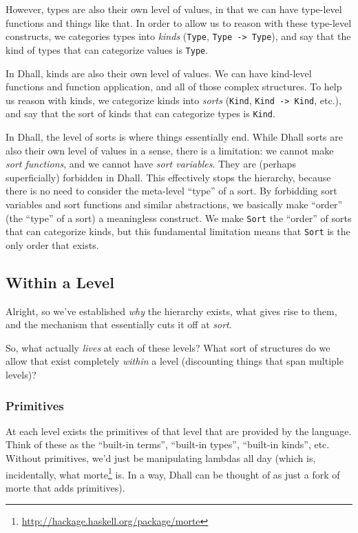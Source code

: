 \documentclass[]{article}
\renewcommand{\href}[2]{#2\footnote{\url{#1}}}
\begin{document}
However, types are also their own level of values, in that we can have
type-level functions and things like that. In order to allow us to reason with
these type-level constructs, we categories types into \emph{kinds}
(\texttt{Type}, \texttt{Type\ -\textgreater{}\ Type}), and say that the kind of
types that can categorize values is \texttt{Type}.

In Dhall, kinds are also their own level of values. We can have kind-level
functions and function application, and all of those complex structures. To help
us reason with kinds, we categorize kinds into \emph{sorts} (\texttt{Kind},
\texttt{Kind\ -\textgreater{}\ Kind}, etc.), and say that the sort of kinds that
can categorize types is \texttt{Kind}.

In Dhall, the level of sorts is where things essentially end. While Dhall sorts
are also their own level of values in a sense, there is a limitation: we cannot
make \emph{sort functions}, and we cannot have \emph{sort variables}. They are
(perhaps superficially) forbidden in Dhall. This effectively stops the
hierarchy, because there is no need to consider the meta-level ``type'' of a
sort. By forbidding sort variables and sort functions and similar abstractions,
we basically make ``order'' (the ``type'' of a sort) a meaningless construct. We
make \texttt{Sort} the ``order'' of sorts that can categorize kinds, but this
fundamental limitation means that \texttt{Sort} is the only order that exists.

\subsection{Within a Level}\label{within-a-level}

Alright, so we've established \emph{why} the hierarchy exists, what gives rise
to them, and the mechanism that essentially cuts it off at \emph{sort}.

So, what actually \emph{lives} at each of these levels? What sort of structures
do we allow that exist completely \emph{within} a level (discounting things that
span multiple levels)?

\subsubsection{Primitives}\label{primitives}

At each level exists the primitives of that level that are provided by the
language. Think of these as the ``built-in terms'', ``built-in types'',
``built-in kinds'', etc. Without primitives, we'd just be manipulating lambdas
all day (which is, incidentally, what
\href{http://hackage.haskell.org/package/morte}{morte} is. In a way, Dhall can
be thought of as just a fork of morte that adds primitives).
\end{document}
